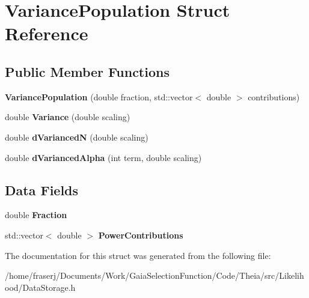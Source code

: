 \hypertarget{structVariancePopulation}{}\section{Variance\+Population Struct Reference}
\label{structVariancePopulation}
\subsection*{Public Member Functions}
\begin{DoxyCompactItemize}
\item 
\mbox{\label{structVariancePopulation_a0a0e089d1cc596857052c0043547adb1}} 
{\bfseries Variance\+Population} (double fraction, std\+::vector$<$ double $>$ contributions)
\item 
\mbox{\label{structVariancePopulation_a7328d57433a870f569cf6e2bcb12e2f3}} 
double {\bfseries Variance} (double scaling)
\item 
\mbox{\label{structVariancePopulation_a5a54f3140bc15898d3bf57340e19b90f}} 
double {\bfseries d\+VariancedN} (double scaling)
\item 
\mbox{\label{structVariancePopulation_ad2a89f4584be76a4822005764f2f6e6c}} 
double {\bfseries d\+Varianced\+Alpha} (int term, double scaling)
\end{DoxyCompactItemize}
\subsection*{Data Fields}
\begin{DoxyCompactItemize}
\item 
\mbox{\label{structVariancePopulation_aaaa1da9b4ed3f0d460a49cd0078330eb}} 
double {\bfseries Fraction}
\item 
\mbox{\label{structVariancePopulation_af81f6fdf859a22cc06de6f5bfb0ed0d0}} 
std\+::vector$<$ double $>$ {\bfseries Power\+Contributions}
\end{DoxyCompactItemize}


The documentation for this struct was generated from the following file\+:\begin{DoxyCompactItemize}
\item 
/home/fraserj/\+Documents/\+Work/\+Gaia\+Selection\+Function/\+Code/\+Theia/src/\+Likelihood/Data\+Storage.\+h\end{DoxyCompactItemize}
